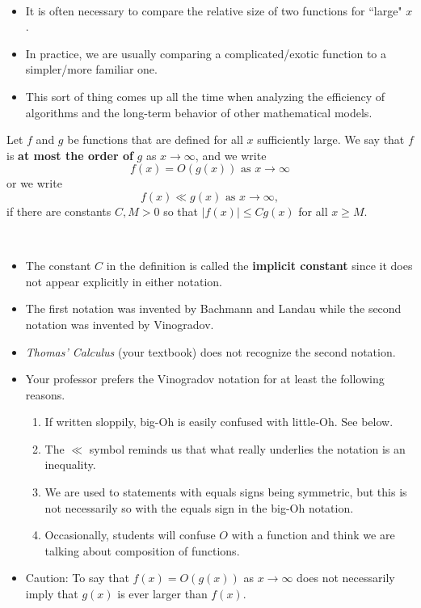 

\begin{remark}\,
\begin{itemize}
\item It is often necessary to compare the relative size of two functions for ``large" $x$.
\item In practice, we are usually comparing a complicated/exotic function to a simpler/more familiar one.
\item This sort of thing comes up all the time when analyzing the efficiency of algorithms and the long-term behavior of other mathematical models.
\end{itemize}
\end{remark}

\begin{definition}
Let $f$ and $g$ be functions that are defined for all $x$ sufficiently large.
We say that $f$ is \textbf{at most the order of} $g$ as $x\to \infty$, and we write
\begin{equation*}
f(x) = O(g(x)) \text{ as } x\to \infty
\end{equation*}
or we write
\begin{equation*}
f(x)\ll g(x) \text{ as } x\to \infty,
\end{equation*}
if there are constants $C, M>0$ so that $|f(x)|\le C g(x)$ for all $x\ge M$.
\end{definition}
\begin{remark}\,
\begin{itemize}
\item The constant $C$ in the definition is called the \textbf{implicit constant} since it does not appear explicitly in either notation.
\item The first notation was invented by Bachmann and Landau while the second notation was invented by Vinogradov.
\item \textit{Thomas' Calculus} (your textbook) does not recognize the second notation.
\item Your professor prefers the Vinogradov notation for at least the following reasons.
\begin{enumerate}
\item If written sloppily, big-Oh is easily confused with little-Oh.  See below.
\item The $\ll$ symbol reminds us that what really underlies the notation is an inequality.
\item We are used to statements with equals signs being symmetric, but this is not necessarily so with the equals sign in the big-Oh notation.
\item Occasionally, students will confuse $O$ with a function and think we are talking about composition of functions.
\end{enumerate}
\item Caution: To say that $f(x) = O(g(x))$ as $x\to \infty$ does not necessarily imply that $g(x)$ is ever larger than $f(x)$.
\end{itemize}
\end{remark}

